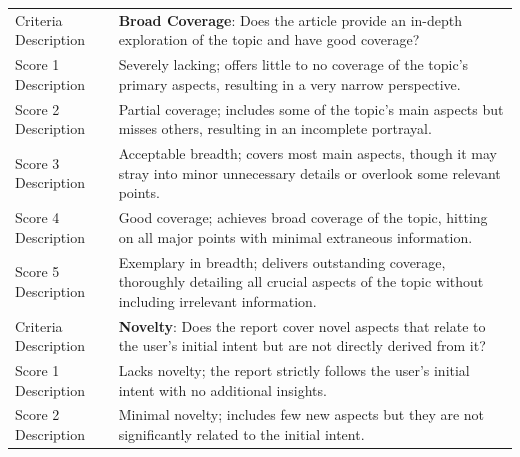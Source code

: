\begin{tabular}{ll} 
\toprule
Criteria Description & \textbf{Broad Coverage}: Does the article provide an in-depth exploration of the topic and have good coverage?                                                                                                               \\
Score 1 Description  & Severely lacking; offers little to no coverage of the topic's primary aspects, resulting in a very narrow perspective.                                                                                                                        \\
Score 2 Description  & Partial coverage; includes some of the topic's main aspects but misses others, resulting in an incomplete portrayal.                                                                                                                              \\
Score 3 Description  & Acceptable breadth; covers most main aspects, though it may stray into minor unnecessary details or overlook some relevant points.                                                                                             \\
Score 4 Description  & Good coverage; achieves broad coverage of the topic, hitting on all major points with minimal extraneous information.                                                                      \\
Score 5 Description  & Exemplary in breadth; delivers outstanding coverage, thoroughly detailing all crucial aspects of the topic without including irrelevant information.                                                                                \\ 
\midrule
Criteria Description & \textbf{Novelty}: Does the report cover novel aspects that relate to the user's initial intent but are not directly derived from it?                                                                                              \\
Score 1 Description  & Lacks novelty; the report strictly follows the user's initial intent with no additional insights.                                                                                                                                     \\
Score 2 Description  & Minimal novelty; includes few new aspects but they are not significantly related to the initial intent.                                                                                              \\

\end{tabular}
